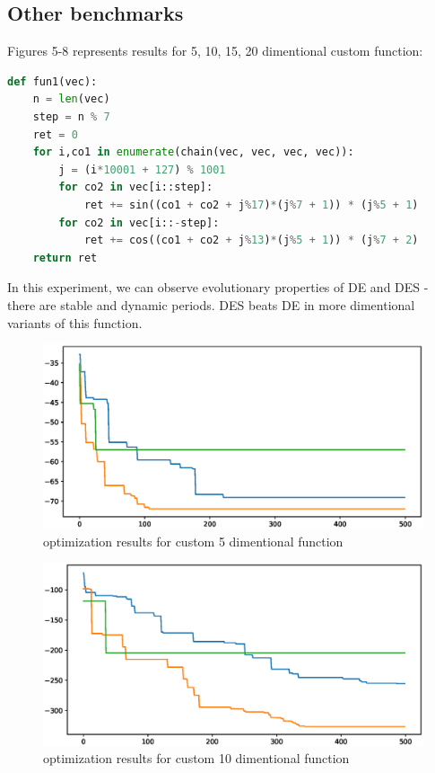 \documentclass[11pt,a4paper]{article}
\begin{document}
\newpage
\subsection{Other benchmarks}\label{subsec:other_testing}

Figures 5-8 represents results for 5, 10, 15, 20 dimentional custom function:
\begin{lstlisting}[language=Python]
def fun1(vec):
    n = len(vec)
    step = n % 7
    ret = 0
    for i,co1 in enumerate(chain(vec, vec, vec, vec)):
        j = (i*10001 + 127) % 1001
        for co2 in vec[i::step]:
            ret += sin((co1 + co2 + j%17)*(j%7 + 1)) * (j%5 + 1)
        for co2 in vec[i::-step]:
            ret += cos((co1 + co2 + j%13)*(j%5 + 1)) * (j%7 + 2)
    return ret
\end{lstlisting}

In this experiment, we can observe evolutionary properties of DE and DES - there are stable and dynamic periods.
DES beats DE in more dimentional variants of this function.

\begin{figure}[H]
	\centering
	\includegraphics[scale=0.6]{fun1_1.eps}
	\caption{optimization results for custom 5 dimentional function}
\end{figure}

\begin{figure}[H]
	\centering
	\includegraphics[scale=0.6]{fun1_2.eps}
	\caption{optimization results for custom 10 dimentional function}
\end{figure}
\end{document}
